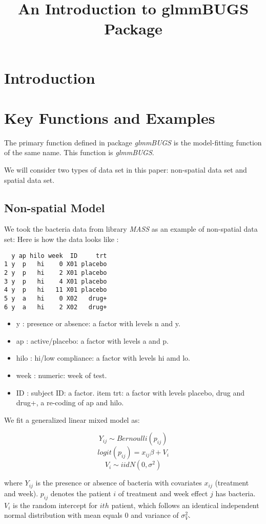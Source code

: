 \documentclass{article}
\title{An Introduction to glmmBUGS Package}
\begin{document}
\maketitle

\large
\section{Introduction}
 


\section{Key Functions and Examples}
The primary function defined in package \textit{glmmBUGS} is the model-fitting function of the same name.
This function is \textit{glmmBUGS}. 

We will consider two types of data set in this paper: non-spatial data set and spatial data set.

\subsection{Non-spatial Model} 
We took the bacteria data from library \textit{MASS} as an example of non-spatial data set: 
Here is how the data looks like : 
\begin{verbatim}
  y ap hilo week  ID     trt
1 y  p   hi    0 X01 placebo
2 y  p   hi    2 X01 placebo
3 y  p   hi    4 X01 placebo
4 y  p   hi   11 X01 placebo
5 y  a   hi    0 X02   drug+
6 y  a   hi    2 X02   drug+
\end{verbatim}
\begin{itemize}
\item y : presence or absence: a factor with levels n and y. 
\item ap : active/placebo: a factor with levels a and p. 
\item hilo : hi/low compliance: a factor with levels hi amd lo. 
\item week : numeric: week of test. 
\item ID : subject ID: a factor. 
item trt: a factor with levels placebo, drug and drug+, a re-coding of ap and hilo. 
\end{itemize} 

We fit a generalized linear mixed model as: 

\[Y_{ij} \sim  Bernoulli(p_{ij})\]
\[logit(p_{ij}) = x_{ij}\beta + V_{i}\]
\[V_{i} \sim iid N(0, \sigma^2)\] 

where $Y_{ij}$ is the presence or absence of bacteria with covariates $x_{ij}$ (treatment and week).  
$p_{ij}$ denotes the patient $i$ of treatment and week effect $j$ has bacteria.
$V_i$ is the random intercept for $ith$ patient, which follows an identical independent normal distribution with mean equals 0 and variance of $\sigma_V^2$.
\end{document}
